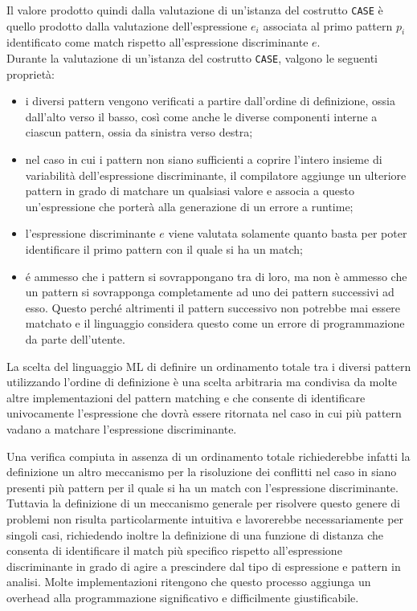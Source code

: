 Il valore prodotto quindi dalla valutazione di un'istanza del costrutto
\texttt{CASE} è quello prodotto dalla valutazione dell’espressione $e_i$
associata al primo pattern $p_i$ identificato come match rispetto
all’espressione discriminante $e$.\\

Durante la valutazione di un'istanza del costrutto \texttt{CASE}, valgono le
seguenti proprietà:

\begin{itemize}

\item i diversi pattern vengono verificati a partire dall’ordine di definizione,
ossia dall’alto verso il basso, così come anche le diverse componenti interne a
ciascun pattern, ossia da sinistra verso destra;

\item nel caso in cui i pattern non siano sufficienti a coprire l’intero insieme
di variabilità dell’espressione discriminante, il compilatore aggiunge un
ulteriore pattern in grado di matchare un qualsiasi valore e associa a questo
un’espressione che porterà alla generazione di un errore a runtime;

\item l’espressione discriminante $e$ viene valutata solamente quanto basta per
poter identificare il primo pattern con il quale si ha un match;

\item é ammesso che i pattern si sovrappongano tra di loro, ma non è ammesso che
un pattern si sovrapponga completamente ad uno dei pattern successivi ad esso.
Questo perché altrimenti il pattern successivo non potrebbe mai essere matchato
e il linguaggio considera questo come un errore di programmazione da parte
dell'utente.

\end{itemize}

La scelta del linguaggio ML di definire un ordinamento totale tra i diversi
pattern utilizzando l’ordine di definizione è una scelta arbitraria ma condivisa
da molte altre implementazioni del pattern matching e che consente di
identificare univocamente l'espressione che dovrà essere ritornata nel caso in
cui più pattern vadano a matchare l'espressione discriminante.

Una verifica compiuta in assenza di un ordinamento totale richiederebbe infatti
la definizione un altro meccanismo per la risoluzione dei conflitti nel caso in
siano presenti più pattern per il quale si ha un match con l’espressione
discriminante. Tuttavia la definizione di un meccanismo generale per risolvere
questo genere di problemi non risulta particolarmente intuitiva e lavorerebbe
necessariamente per singoli casi, richiedendo inoltre la definizione di una
funzione di distanza che consenta di identificare il match più specifico
rispetto all’espressione discriminante in grado di agire a prescindere dal tipo
di espressione e pattern in analisi. Molte implementazioni ritengono che questo
processo aggiunga un overhead alla programmazione significativo e difficilmente
giustificabile.

